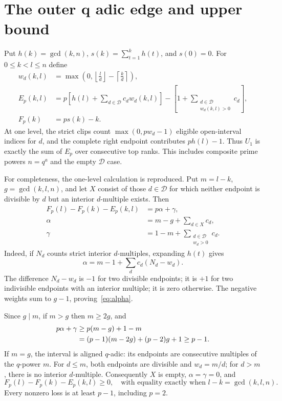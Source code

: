 \documentclass[11pt,letterpaper]{article}
\theoremstyle{definition}\newtheorem{definition}{Definition}
\newcommand{\D}{\mathcal D}
\begin{document}
\section{The outer q adic edge and upper bound}\label{sec:edge}
Put $h(k)=\gcd(k,n)$, $s(k)=\sum_{t=1}^{k}h(t)$, and $s(0)=0$. For $0\le k<l\le n$ define
\begin{align}
w_d(k,l)&=\max\left(0,\left\lfloor\frac ld\right\rfloor-\left\lceil\frac kd\right\rceil\right),\label{eq:w}\\
E_p(k,l)&=p\left[h(l)+\sum_{d\in\D}c_dw_d(k,l)\right]
-\left[1+\sum_{\substack{d\in\D\\w_d(k,l)>0}}c_d\right],\label{eq:edge}\\
F_p(k)&=ps(k)-k.\label{eq:potential}
\end{align}
At one level, the strict clips count $\max(0,pw_d-1)$ eligible open-interval indices for $d$, and the complete right endpoint contributes $ph(l)-1$. Thus $U_1$ is exactly the sum of $E_p$ over consecutive top ranks. This includes composite prime powers $n=q^a$ and the empty $\D$ case.

For completeness, the one-level calculation is reproduced. Put $m=l-k$, $g=\gcd(k,l,n)$, and let $X$ consist of those $d\in\D$ for which neither endpoint is divisible by $d$ but an interior $d$-multiple exists. Then
\begin{align}
F_p(l)-F_p(k)-E_p(k,l)&=p\alpha+\gamma,\label{eq:loss}\\
\alpha&=m-g+\sum_{d\in X}c_d,\label{eq:alpha}\\
\gamma&=1-m+\sum_{\substack{d\in\D\\w_d>0}}c_d.\label{eq:gamma}
\end{align}
Indeed, if $N_d$ counts strict interior $d$-multiples, expanding $h(t)$ gives
\[
\alpha=m-1+\sum_d c_d(N_d-w_d).
\]
The difference $N_d-w_d$ is $-1$ for two divisible endpoints; it is $+1$ for two indivisible endpoints with an interior multiple; it is zero otherwise. The negative weights sum to $g-1$, proving~\eqref{eq:alpha}.

Since $g\mid m$, if $m>g$ then $m\ge2g$, and
\begin{align}
p\alpha+\gamma&\ge p(m-g)+1-m\notag\\
&=(p-1)(m-2g)+(p-2)g+1\ge p-1.\label{eq:positive}
\end{align}
If $m=g$, the interval is aligned $q$-adic: its endpoints are consecutive multiples of the $q$-power $m$. For $d\le m$, both endpoints are divisible and $w_d=m/d$; for $d>m$, there is no interior $d$-multiple. Consequently $X$ is empty, $\alpha=\gamma=0$, and
\begin{equation}
F_p(l)-F_p(k)-E_p(k,l)\ge0,
\quad\text{with equality exactly when }l-k=\gcd(k,l,n).\label{eq:zero}
\end{equation}
Every nonzero loss is at least $p-1$, including $p=2$.
\end{document}

